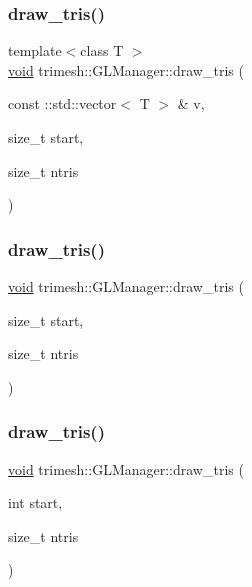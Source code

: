 \subsubsection{\texorpdfstring{draw\+\_\+tris()}{draw\_tris()}\hspace{0.1cm}{\footnotesize\ttfamily [6/9]}}
{\footnotesize\ttfamily template$<$class T $>$ \\
\hyperlink{namespacetrimesh_a784ddfd979e1c579bda795a8edfc3f43}{void} trimesh\+::\+G\+L\+Manager\+::draw\+\_\+tris (\begin{DoxyParamCaption}\item[{const \+::std\+::vector$<$ T $>$ \&}]{v,  }\item[{size\+\_\+t}]{start,  }\item[{size\+\_\+t}]{ntris }\end{DoxyParamCaption})\hspace{0.3cm}{\ttfamily [inline]}}

\mbox{\label{classtrimesh_1_1GLManager_aa9736018059ec4fee93cd38a60dbbe11}} 
\subsubsection{\texorpdfstring{draw\+\_\+tris()}{draw\_tris()}\hspace{0.1cm}{\footnotesize\ttfamily [7/9]}}
{\footnotesize\ttfamily \hyperlink{namespacetrimesh_a784ddfd979e1c579bda795a8edfc3f43}{void} trimesh\+::\+G\+L\+Manager\+::draw\+\_\+tris (\begin{DoxyParamCaption}\item[{size\+\_\+t}]{start,  }\item[{size\+\_\+t}]{ntris }\end{DoxyParamCaption})}

\mbox{\label{classtrimesh_1_1GLManager_ad7eeb003f0ecbb29279a8e6965bf32c1}} 
\subsubsection{\texorpdfstring{draw\+\_\+tris()}{draw\_tris()}\hspace{0.1cm}{\footnotesize\ttfamily [8/9]}}
{\footnotesize\ttfamily \hyperlink{namespacetrimesh_a784ddfd979e1c579bda795a8edfc3f43}{void} trimesh\+::\+G\+L\+Manager\+::draw\+\_\+tris (\begin{DoxyParamCaption}\item[{int}]{start,  }\item[{size\+\_\+t}]{ntris }\end{DoxyParamCaption})\hspace{0.3cm}{\ttfamily [inline]}}

